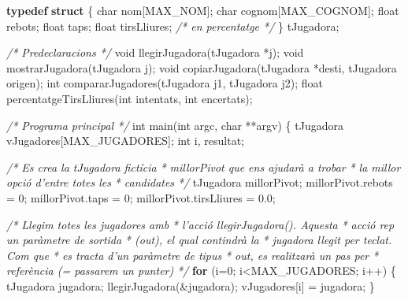 \documentclass[]{book}
\newenvironment{Shaded}{\begin{snugshade}}{\end{snugshade}}
\newcommand{\KeywordTok}[1]{\textcolor[rgb]{0.13,0.29,0.53}{\textbf{#1}}}
\newcommand{\DataTypeTok}[1]{\textcolor[rgb]{0.13,0.29,0.53}{#1}}
\newcommand{\DecValTok}[1]{\textcolor[rgb]{0.00,0.00,0.81}{#1}}
\newcommand{\FloatTok}[1]{\textcolor[rgb]{0.00,0.00,0.81}{#1}}
\newcommand{\CommentTok}[1]{\textcolor[rgb]{0.56,0.35,0.01}{\textit{#1}}}
\newcommand{\ControlFlowTok}[1]{\textcolor[rgb]{0.13,0.29,0.53}{\textbf{#1}}}
\newcommand{\NormalTok}[1]{#1}
\begin{document}
\begin{Shaded}
\begin{Highlighting}[]
\KeywordTok{typedef} \KeywordTok{struct}\NormalTok{ \{}
    \DataTypeTok{char}\NormalTok{ nom[MAX_NOM];}
    \DataTypeTok{char}\NormalTok{ cognom[MAX_COGNOM];}
    \DataTypeTok{float}\NormalTok{ rebots;}
    \DataTypeTok{float}\NormalTok{ taps;}
    \DataTypeTok{float}\NormalTok{ tirsLliures; }\CommentTok{/* en percentatge */}
\NormalTok{\} tJugadora;}

\CommentTok{/* Predeclaracions */}
\DataTypeTok{void}\NormalTok{ llegirJugadora(tJugadora *j);}
\DataTypeTok{void}\NormalTok{ mostrarJugadora(tJugadora j);}
\DataTypeTok{void}\NormalTok{ copiarJugadora(tJugadora *desti, tJugadora origen);}
\DataTypeTok{int}\NormalTok{ compararJugadores(tJugadora j1, tJugadora j2);}
\DataTypeTok{float}\NormalTok{ percentatgeTirsLliures(}\DataTypeTok{int}\NormalTok{ intentats, }\DataTypeTok{int}\NormalTok{ encertats);}

\CommentTok{/* Programa principal */}
\DataTypeTok{int}\NormalTok{ main(}\DataTypeTok{int}\NormalTok{ argc, }\DataTypeTok{char}\NormalTok{ **argv) \{}
\NormalTok{    tJugadora vJugadores[MAX_JUGADORES];}
    \DataTypeTok{int}\NormalTok{ i, resultat;}

    \CommentTok{/* Es crea la tJugadora fictícia }
\CommentTok{     * millorPivot que ens ajudarà a trobar }
\CommentTok{     * la millor opció d'entre totes les }
\CommentTok{     * candidates}
\CommentTok{     */}
\NormalTok{    tJugadora millorPivot;    }
\NormalTok{    millorPivot.rebots = }\DecValTok{0}\NormalTok{;}
\NormalTok{    millorPivot.taps = }\DecValTok{0}\NormalTok{;}
\NormalTok{    millorPivot.tirsLliures = }\FloatTok{0.0}\NormalTok{;}

    \CommentTok{/* Llegim totes les jugadores amb }
\CommentTok{     * l'acció llegirJugadora(). Aquesta}
\CommentTok{     * acció rep un paràmetre de sortida}
\CommentTok{     * (out), el qual contindrà la }
\CommentTok{     * jugadora llegit per teclat. Com que}
\CommentTok{     * es tracta d'un paràmetre de tipus }
\CommentTok{     * out, es realitzarà un pas per }
\CommentTok{     * referència (= passarem un punter)}
\CommentTok{     */}
    \ControlFlowTok{for}\NormalTok{ (i=}\DecValTok{0}\NormalTok{; i<MAX_JUGADORES; i++) \{}
\NormalTok{        tJugadora jugadora;}
\NormalTok{        llegirJugadora(&jugadora);}
\NormalTok{        vJugadores[i] = jugadora;}
\NormalTok{    \}}
    

\end{Highlighting}
\end{Shaded}
\end{document}
